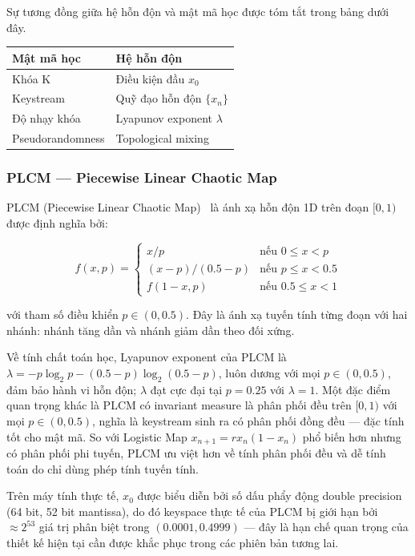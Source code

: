 Sự tương đồng giữa hệ hỗn độn và mật mã học được tóm tắt trong bảng dưới đây.

\begin{center}
\begin{tabular}{|l|l|}
\hline
\textbf{Mật mã học} & \textbf{Hệ hỗn độn} \\
\hline
Khóa K & Điều kiện đầu $x_0$ \\
\hline
Keystream & Quỹ đạo hỗn độn $\{x_n\}$ \\
\hline
Độ nhạy khóa & Lyapunov exponent $\lambda$ \\
\hline
Pseudorandomness & Topological mixing \\
\hline
\end{tabular}
\end{center}

\subsubsection{PLCM --- Piecewise Linear Chaotic Map}

PLCM (Piecewise Linear Chaotic Map)~\cite{li_plcm} là ánh xạ hỗn độn 1D trên
đoạn $[0, 1)$ được định nghĩa bởi:

\begin{equation}
f(x, p) = \begin{cases}
  x / p                    & \text{nếu } 0 \leq x < p \\
  (x - p)/(0.5 - p)        & \text{nếu } p \leq x < 0.5 \\
  f(1 - x, p)              & \text{nếu } 0.5 \leq x < 1
\end{cases}
\label{eq:plcm}
\end{equation}

với tham số điều khiển $p \in (0, 0.5)$. Đây là ánh xạ tuyến tính từng đoạn với hai nhánh: nhánh tăng dần và nhánh giảm dần theo đối xứng.

Về tính chất toán học, Lyapunov exponent của PLCM là $\lambda = -p\log_2 p - (0.5 - p)\log_2(0.5 - p)$, luôn dương với mọi $p \in (0, 0.5)$, đảm bảo hành vi hỗn độn; $\lambda$ đạt cực đại tại $p = 0.25$ với $\lambda = 1$. Một đặc điểm quan trọng khác là PLCM có invariant measure là phân phối đều trên $[0, 1)$ với mọi $p \in (0, 0.5)$, nghĩa là keystream sinh ra có phân phối đồng đều --- đặc tính tốt cho mật mã. So với Logistic Map $x_{n+1} = rx_n(1-x_n)$ phổ biến hơn nhưng có phân phối phi tuyến, PLCM ưu việt hơn về tính phân phối đều và dễ tính toán do chỉ dùng phép tính tuyến tính.

Trên máy tính thực tế, $x_0$ được biểu diễn bởi số dấu phẩy động double precision (64 bit, 52 bit mantissa), do đó keyspace thực tế của PLCM bị giới hạn bởi $\approx 2^{53}$ giá trị phân biệt trong $(0.0001, 0.4999)$ --- đây là hạn chế quan trọng của thiết kế hiện tại cần được khắc phục trong các phiên bản tương lai.

